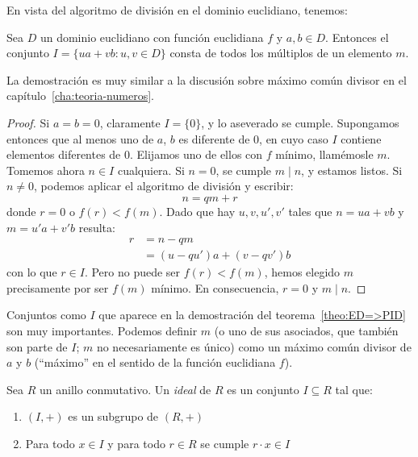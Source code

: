   En vista del algoritmo de división en el dominio euclidiano,
  tenemos:
  \begin{theorem}
    \label{theo:ED=>PID}
    Sea \(D\) un dominio euclidiano con función euclidiana \(f\)
    y \(a, b \in D\).
    Entonces el conjunto \(I = \{u a + v b \colon u, v \in D\}\)
    consta de todos los múltiplos de un elemento \(m\).
  \end{theorem}
  La demostración es muy similar
  a la discusión sobre máximo común divisor
  en el capítulo~\ref{cha:teoria-numeros}.
  \begin{proof}
    Si \(a = b = 0\),
    claramente \(I = \{0\}\),
    y lo aseverado se cumple.
    Supongamos entonces que al menos uno
    de \(a\), \(b\) es diferente de 0,
    en cuyo caso \(I\) contiene elementos diferentes de 0.
    Elijamos uno de ellos con \(f\) mínimo,
    llamémosle \(m\).
    Tomemos ahora \(n \in I\) cualquiera.
    Si \(n = 0\),
    se cumple \(m \mid n\),
    y estamos listos.
    Si \(n \ne 0\),
    podemos aplicar el algoritmo de división y escribir:
    \begin{equation*}
      n = q m + r
    \end{equation*}
    donde \(r = 0\) o \(f(r) < f(m)\).
    Dado que hay \(u, v, u', v'\) tales que \(n = u a + v b\)
    y \(m = u' a + v' b\) resulta:
    \begin{align*}
      r
	&= n - q m \\
	&= (u - q u') a + (v - q v') b
    \end{align*}
    con lo que \(r \in I\).
    Pero no puede ser \(f(r) < f(m)\),
    hemos elegido \(m\) precisamente por ser \(f(m)\) mínimo.
    En consecuencia,
    \(r = 0\) y \(m \mid n\).
  \end{proof}
  Conjuntos como \(I\)
  que aparece en la demostración del teorema~\ref{theo:ED=>PID}
  son muy importantes.
  Podemos definir \(m\)
  (o uno de sus asociados,
   que también son parte de \(I\);
   \(m\) no necesariamente es único)
  como un máximo común divisor de \(a\) y \(b\)
  (``máximo'' en el sentido de la función euclidiana \(f\)).
  \begin{definition}
    Sea \(R\) un anillo conmutativo.
    Un \emph{ideal} de \(R\)
    es un conjunto \(I \subseteq R\)
    tal que:
    \begin{enumerate}
    \item
      \((I, +)\) es un subgrupo de \((R, +)\)
    \item
      Para todo \(x \in I\)
      y para todo \(r \in R\)
      se cumple \(r \cdot x \in I\)
    \end{enumerate}
  \end{definition}
